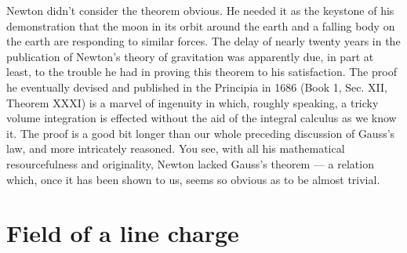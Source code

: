 Newton didn't consider the theorem obvious. He needed it as the
keystone of his demonstration that the moon in its orbit around the
earth and a falling body on the earth are responding to similar forces.
The delay of nearly twenty years in the publication of Newton's
theory of gravitation was apparently due, in part at least, to the
trouble he had in proving this theorem to his satisfaction. The proof
he eventually devised and published in the Principia in 1686 (Book 1,
Sec. XII, Theorem XXXI) is a marvel of ingenuity in which, roughly
speaking, a tricky volume integration is effected without the aid of
the integral calculus as we know it. The proof is a good bit longer
than our whole preceding discussion of Gauss's law, and more
intricately reasoned. You see, with all his mathematical resourcefulness
and originality, Newton lacked Gauss's theorem --- a relation
which, once it has been shown to us, seems so obvious as to be almost
trivial.

\section{Field of a line charge}

